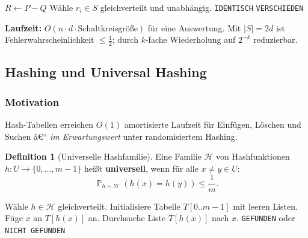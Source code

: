 ﻿\documentclass[12pt,a4paper]{article}
\theoremstyle{definition}
\newtheorem{definition}{Definition}[section]
\theoremstyle{plain}
\theoremstyle{remark}
\DeclareMathOperator{\Prob}{\mathbb{P}}
\begin{document}
\begin{algorithm}[H]
  \caption{Randomisierter Polynom-Identitätstest (Schwartz-Zippel)}
  \label{alg:sz}
  \begin{algorithmic}[1]
    \State $R \gets P - Q$
      \State Wähle $r_i \in S$ gleichverteilt und unabhängig.
    \EndFor
      \State \Return \texttt{IDENTISCH} \Comment{Falsch-Positiv mit $\Prob \leq d/|S| \leq 1/2$}
    \Else
      \State \Return \texttt{VERSCHIEDEN} 
    \EndIf
  \end{algorithmic}
\end{algorithm}

\textbf{Laufzeit:} $O(n \cdot d \cdot \text{Schaltkreisgröße})$ für eine
Auswertung. Mit $|S| = 2d$ ist Fehlerwahrscheinlichkeit $\leq \frac{1}{2}$;
durch $k$-fache Wiederholung auf $2^{-k}$ reduzierbar.

\subsection{Hashing und Universal Hashing}
\label{subsec:hashing}

\subsubsection{Motivation}

Hash-Tabellen erreichen $O(1)$ amortisierte Laufzeit für Einfügen, Löschen
und Suchen â€“ \emph{im Erwartungswert} unter randomisiertem Hashing.

\begin{definition}[Universelle Hashfamilie]\label{def:uhash}
  Eine Familie $\mathcal{H}$ von Hashfunktionen $h: U \to \{0,\ldots,m-1\}$
  heißt \textbf{universell}, wenn für alle $x \neq y \in U$:
  \[
    \Prob_{h\sim\mathcal{H}}(h(x) = h(y)) \leq \frac{1}{m}.
  \]
\end{definition}

\begin{algorithm}[H]
  \caption{Randomisiertes Hashing (Chaining)}
  \label{alg:hashing}
  \begin{algorithmic}[1]
    \State Wähle $h \in \mathcal{H}$ gleichverteilt.
    \State Initialisiere Tabelle $T[0..m-1]$ mit leeren Listen.
    \Statex
      \State Füge $x$ an $T[h(x)]$ an.
    \EndFunction
    \Statex
      \State Durchsuche Liste $T[h(x)]$ nach $x$.
      \State \Return \texttt{GEFUNDEN} oder \texttt{NICHT GEFUNDEN}
    \EndFunction
  \end{algorithmic}
\end{algorithm}
\end{document}
